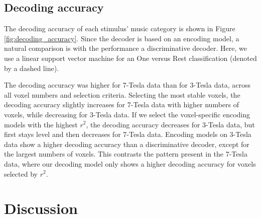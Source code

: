 \subsection*{Decoding accuracy}

The decoding accuracy of each stimulus' music category is shown in Figure
\ref{fig:decoding_accuracy}. Since the decoder is based on an encoding model, a
natural comparison is with the performance a discriminative decoder. Here, we
use a linear support vector machine for an One versus Rest classification
(denoted by a dashed line).

The decoding accuracy was higher for 7-Tesla data
than for 3-Tesla data, across all voxel numbers and selection criteria.
Selecting the most stable voxels, the decoding accuracy slightly increases for
7-Tesla data with higher numbers of voxels, while decreasing for 3-Tesla data.
If we select the voxel-specific encoding models with the highest $r^2$, the
decoding accuracy decreases for 3-Tesla data, but first stays level and then
decreases for 7-Tesla data. Encoding models on 3-Tesla data show a higher
decoding accuracy than a discriminative decoder, except for the largest numbers
of voxels. This contrasts the pattern present in the 7-Tesla data, where our decoding model only
shows a higher decoding accuracy for voxels selected by $r^2$.



\section*{Discussion}

